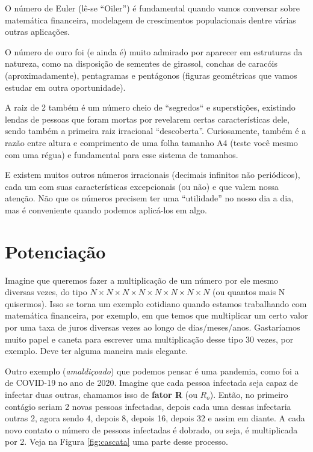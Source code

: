 O número de Euler (lê-se ``Oiler'') é fundamental quando vamos conversar sobre matemática financeira, modelagem de crescimentos populacionais dentre várias outras aplicações. 

O número de ouro foi (e ainda é) muito admirado por aparecer em estruturas da natureza, como na disposição de sementes de girassol, conchas de caracóis (aproximadamente), pentagramas e pentágonos (figuras geométricas que vamos estudar em outra oportunidade).

A raiz de 2 também é um número cheio de ``segredos`` e superstições, existindo lendas de pessoas que foram mortas por revelarem certas características dele, sendo também a primeira raiz irracional ``descoberta''. Curiosamente, também é a razão entre altura e comprimento de uma folha tamanho A4 (teste você mesmo com uma régua) e fundamental para esse sistema de tamanhos.

E existem muitos outros números irracionais (decimais infinitos não periódicos), cada um com suas características excepcionais (ou não) e que valem nossa atenção. Não que os números precisem ter uma ``utilidade'' no nosso dia a dia, mas é conveniente quando podemos aplicá-los em algo.



\newpage
\section{Potenciação}
\label{potenciacao}
Imagine que queremos fazer a multiplicação de um número por ele mesmo diversas vezes, do tipo $N\times N\times N\times N\times N\times N\times N\times N$ (ou quantos mais N quisermos). Isso se torna um exemplo cotidiano quando estamos trabalhando com matemática financeira, por exemplo, em que temos que multiplicar um certo valor por uma taxa de juros diversas vezes ao longo de dias/meses/anos. Gastaríamos muito papel e caneta para escrever uma multiplicação desse tipo 30 vezes, por exemplo. Deve ter alguma maneira mais elegante. 

Outro exemplo (\textit{amaldiçoado}) que podemos pensar é uma pandemia, como foi a de COVID-19 no ano de 2020. Imagine que cada pessoa infectada seja capaz de infectar duas outras, chamamos isso de \textbf{fator R} (ou \(R_o\)). Então, no primeiro contágio seriam 2 novas pessoas infectadas, depois cada uma dessas infectaria outras 2, agora sendo 4, depois 8, depois 16, depois 32 e assim em diante. A cada novo contato o número de pessoas infectadas é dobrado, ou seja, é multiplicada por 2. Veja na Figura \ref{fig:cascata} uma parte desse processo.

